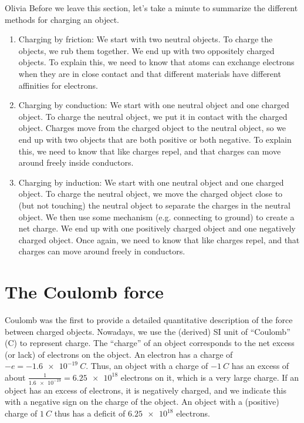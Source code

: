 \begin{studentOpinion}{Olivia}
Before we leave this section, let's take a minute to summarize the different methods for charging an object. 
\begin{enumerate}
\item Charging by friction: We start with two neutral objects. To charge the objects, we rub them together. We end up with two oppositely charged objects. To explain this, we need to know that atoms can exchange electrons when they are in close contact and that different materials have different affinities for electrons.

\item Charging by conduction: We start with one neutral object and one charged object. To charge the neutral object, we put it in contact with the charged object. Charges move from the charged object to the neutral object, so we end up with two objects that are both positive or both negative. To explain this, we need to know that like charges repel, and that charges can move around freely inside conductors. 

\item Charging by induction: We start with one neutral object and one charged object. To charge the neutral object, we move the charged object close to (but not touching) the neutral object to separate the charges in the neutral object. We then use some mechanism (e.g. connecting to ground) to create a net charge. We end up with one positively charged object and one negatively charged object. Once again, we need to know that like charges repel, and that charges can move around freely in conductors. 
\end{enumerate}


\end{studentOpinion}

\section{The Coulomb force}
Coulomb was the first to provide a detailed quantitative description of the force between charged objects. Nowadays, we use the (derived) SI unit of ``Coulomb'' (C) to represent charge. The ``charge'' of an object corresponds to the net excess (or lack) of electrons on the object. An electron has a charge of $-e=\SI{-1.6e-19}{C}$. Thus, an object with a charge of $\SI{-1}{C}$ has an excess of about $\frac{1}{\num{1.6e-19}}=\num{6.25e18}$ electrons on it, which is a very large charge. If an object has an excess of electrons, it is negatively charged, and we indicate this with a negative sign on the charge of the object. An object with a (positive) charge of $\SI{1}{C}$ thus has a deficit of $\num{6.25e18}$ electrons.

